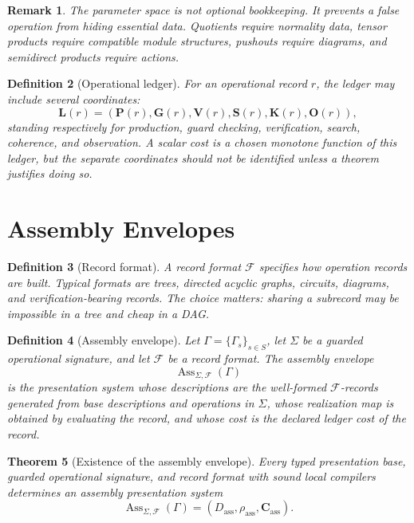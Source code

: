 \documentclass[11pt]{article}
\newtheorem{theorem}{Theorem}[section]
\newtheorem{definition}[theorem]{Definition}
\newtheorem{remark}[theorem]{Remark}
\begin{document}
\begin{remark}
The parameter space is not optional bookkeeping.  It prevents a false operation from hiding essential data.  Quotients require normality data, tensor products require compatible module structures, pushouts require diagrams, and semidirect products require actions.
\end{remark}

\begin{definition}[Operational ledger]
For an operational record \(r\), the ledger may include several coordinates:
\[
\mathbf L(r)=
(\mathbf P(r),\mathbf G(r),\mathbf V(r),\mathbf S(r),\mathbf K(r),\mathbf O(r)),
\]
standing respectively for production, guard checking, verification, search, coherence, and observation.  A scalar cost is a chosen monotone function of this ledger, but the separate coordinates should not be identified unless a theorem justifies doing so.
\end{definition}

\section{Assembly Envelopes}

\begin{definition}[Record format]
A record format \(\mathcal F\) specifies how operation records are built.  Typical formats are trees, directed acyclic graphs, circuits, diagrams, and verification-bearing records.  The choice matters: sharing a subrecord may be impossible in a tree and cheap in a DAG.
\end{definition}

\begin{definition}[Assembly envelope]
Let \(\Gamma=\{\Gamma_s\}_{s\in S}\), let \(\Sigma\) be a guarded operational signature, and let \(\mathcal F\) be a record format.  The assembly envelope
\[
\operatorname{Ass}_{\Sigma,\mathcal F}(\Gamma)
\]
is the presentation system whose descriptions are the well-formed \(\mathcal F\)-records generated from base descriptions and operations in \(\Sigma\), whose realization map is obtained by evaluating the record, and whose cost is the declared ledger cost of the record.
\end{definition}

\begin{theorem}[Existence of the assembly envelope]
Every typed presentation base, guarded operational signature, and record format with sound local compilers determines an assembly presentation system
\[
\operatorname{Ass}_{\Sigma,\mathcal F}(\Gamma)
=
(D_{\operatorname{ass}},\rho_{\operatorname{ass}},\mathbf C_{\operatorname{ass}}).
\]
\end{theorem}
\end{document}
